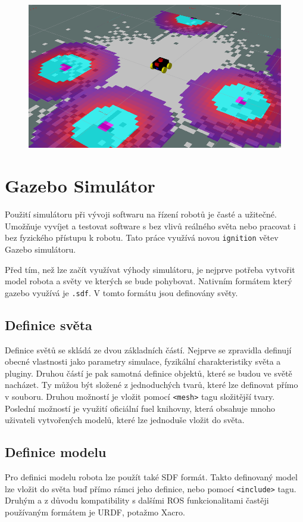 \begin{figure}[h!]
	\centering
	\includegraphics[scale=0.4]{obrazky-figures/nav2.png}
	\caption{}
	\label{}
\end{figure}

\section{Gazebo Simulátor}
Použití simulátoru při vývoji softwaru na řízení robotů je časté a užitečné. Umožňuje vyvíjet a testovat software s bez vlivů reálného světa nebo pracovat i bez fyzického přístupu k robotu. Tato práce využívá novou \verb|ignition| větev Gazebo simulátoru.

Před tím, než lze začít využívat výhody simulátoru, je nejprve potřeba vytvořit model robota a světy ve kterých se bude pohybovat. Nativním formátem který gazebo využívá je \verb|.sdf|. V tomto formátu jsou definovány světy.

\subsection*{Definice světa}
Definice světů se skládá ze dvou základních částí. Nejprve se zpravidla definují obecné vlastnosti jako parametry simulace, fyzikální charakteristiky světa a pluginy. Druhou částí je pak samotná definice objektů, které se budou ve světě nacházet. Ty můžou být složené z jednoduchých tvarů, které lze definovat přímo v souboru. Druhou možností je vložit pomocí \verb|<mesh>| tagu složitější tvary. Poslední možností je využití oficiální fuel knihovny, která obsahuje mnoho uživateli vytvořených modelů, které lze jednoduše vložit do světa.

\subsection*{Definice modelu}
Pro definici modelu robota lze použít také SDF formát. Takto definovaný model lze vložit do světa buď přímo rámci jeho definice, nebo pomocí \verb|<include>| tagu. Druhým a z důvodu kompatibility s dalšími ROS funkcionalitami častěji používaným formátem je URDF, potažmo Xacro. 

